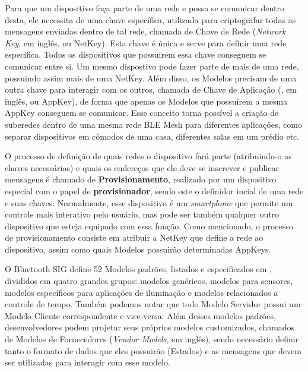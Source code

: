 \documentclass[../monografia.tex]{subfiles}
\begin{document}
Para que um dispositivo faça parte de uma rede e possa se comunicar dentro desta, ele necessita de uma chave específica, utilizada para criptografar todas as mensagens enviadas dentro de tal rede, chamada de Chave de Rede (\textit{Network Key}, em inglês, ou NetKey). Esta chave é única e serve para definir uma rede específica. Todos os dispositivos que possuirem essa chave conseguem se comunicar entre si. Um mesmo dispostivo pode fazer parte de mais de uma rede, possuindo assim mais de uma NetKey. Além disso, os Modelos precisam de uma outra chave para interagir com os outros, chamada de Chave de Aplicação (, em inglês, ou AppKey), de forma que apenas os Modelos que possuírem a mesma AppKey conseguem se comunicar. Esse conceito torna possível a criação de suberedes dentro de uma mesma rede BLE Mesh para diferentes aplicações, como separar dispositivos em cômodos de uma casa, diferentes salas em um prédio etc.

O processo de definição de quais redes o dispositivo fará parte (atribuindo-o as chaves necessárias) e quais os endereços que ele deve se inscrever e publicar mensagens é chamado de \textbf{Provisionamento}, realizado por um dispositivo especial com o papel de \textbf{provisionador}, sendo este o definidor incial de uma rede e suas chaves. Normalmente, esse dispositivo é um \textit{smartphone} que permite um controle mais interativo pelo usuário, mas pode ser também qualquer outro dispositivo que esteja equipado com essa função. Como mencionado, o processo de provisionamento consiste em atribuir a NetKey que define a rede ao dispositivo, assim como quais Modelos possuirão determinadas AppKeys.

O Bluetooth SIG define 52 Modelos padrões, listados e especificados em \cite{BLE-mesh}, divididos em quatro grandes grupos: modelos genéricos, modelos para sensores, modelos específicos para aplicações de iluminação e modelos relacionados a controle de tempo. Também podemos notar que todo Modelo Servidor possui um Modelo Cliente correspondente e vice-versa. Além desses modelos padrões, desenvolvedores podem projetar seus próprios modelos customizados, chamados de Modelos de Fornecedores (\textit{Vendor Models}, em inglês), sendo necessário definir tanto o formato de dados que eles possuirão (Estados) e as mensagens que devem ser utilizadas para interagir com esse modelo.
\end{document}

